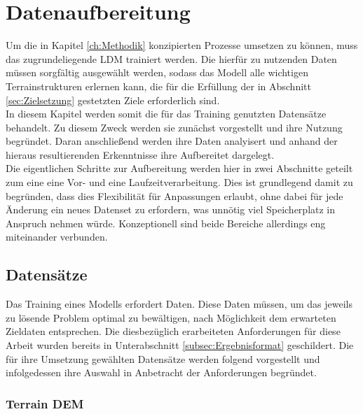 
\chapter{Datenaufbereitung}

Um die in Kapitel \ref{ch:Methodik} konzipierten Prozesse umsetzen zu können, muss das zugrundeliegende LDM trainiert werden. Die hierfür zu nutzenden Daten müssen sorgfältig ausgewählt werden, sodass das Modell alle wichtigen Terrainstrukturen erlernen kann, die für die Erfüllung der in Abschnitt \ref{sec:Zielsetzung} gestetzten Ziele erforderlich sind. \\
In diesem Kapitel werden somit die für das Training genutzten Datensätze behandelt. Zu diesem Zweck werden sie zunächst vorgestellt und ihre Nutzung begründet. Daran anschließend werden ihre Daten analyisert und anhand der hieraus resultierenden Erkenntnisse ihre Aufbereitet dargelegt. \\
Die eigentlichen Schritte zur Aufbereitung werden hier in zwei Abschnitte geteilt zum eine eine Vor- und eine Laufzeitverarbeitung. Dies ist grundlegend damit zu begründen, dass dies Flexibilität für Anpassungen erlaubt, ohne dabei für jede Änderung ein neues Datenset zu erfordern, was unnötig viel Speicherplatz in Anspruch nehmen würde. Konzeptionell sind beide Bereiche allerdings eng miteinander verbunden.

\section{Datensätze}

Das Training eines Modells erfordert Daten. Diese Daten müssen, um das jeweils zu lösende Problem optimal zu bewältigen, nach Möglichkeit dem erwarteten Zieldaten entsprechen. Die diesbezüglich erarbeiteten Anforderungen für diese Arbeit wurden bereits in Unterabschnitt \ref{subsec:Ergebnisformat} geschildert. Die für ihre Umsetzung gewählten Datensätze werden folgend vorgestellt und infolgedessen ihre Auswahl in Anbetracht der Anforderungen begründet.

\subsection{Terrain DEM}

